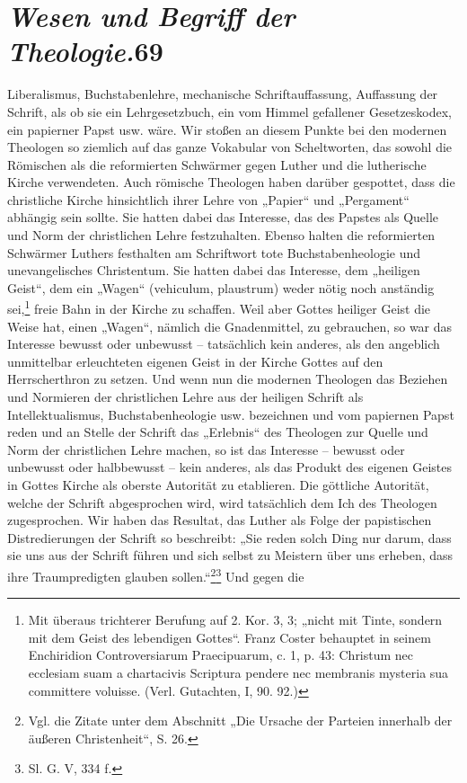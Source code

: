 \section*{\textsl{Wesen und Begriff der Theologie.}\hfill 69}

Liberalismus, Buchstabenlehre, mechanische Schriftauffassung, Auffassung der Schrift, als ob sie ein Lehrgesetzbuch, ein vom Himmel gefallener Gesetzeskodex, ein papierner Papst usw. wäre. Wir stoßen an diesem Punkte bei den modernen Theologen so ziemlich auf das ganze Vokabular von Scheltworten, das sowohl die Römischen als die reformierten Schwärmer gegen Luther und die lutherische Kirche verwendeten. Auch römische Theologen haben darüber gespottet, dass die christliche Kirche hinsichtlich ihrer Lehre von „Papier“ und „Pergament“ abhängig sein sollte. Sie hatten dabei das Interesse, das des Papstes als Quelle und Norm der christlichen Lehre festzuhalten. Ebenso halten die reformierten Schwärmer Luthers festhalten am Schriftwort tote Buchstabenheologie und unevangelisches Christentum. Sie hatten dabei das Interesse, dem „heiligen Geist“, dem ein „Wagen“ (vehiculum, plaustrum) weder nötig noch anständig sei,\footnote{Mit überaus trichterer Berufung auf 2. Kor. 3, 3; „nicht mit Tinte, sondern mit dem Geist des lebendigen Gottes“. Franz Coster behauptet in seinem Enchiridion Controversiarum Praecipuarum, c. 1, p. 43: Christum nec ecclesiam suam a chartacivis Scriptura pendere nec membranis mysteria sua committere voluisse. (Verl. Gutachten, I, 90. 92.)} freie Bahn in der Kirche zu schaffen. Weil aber Gottes heiliger Geist die Weise hat, einen „Wagen“, nämlich die Gnadenmittel, zu gebrauchen, so war das Interesse bewusst oder unbewusst – tatsächlich kein anderes, als den angeblich unmittelbar erleuchteten eigenen Geist in der Kirche Gottes auf den Herrscherthron zu setzen. Und wenn nun die modernen Theologen das Beziehen und Normieren der christlichen Lehre aus der heiligen Schrift als Intellektualismus, Buchstabenheologie usw. bezeichnen und vom papiernen Papst reden und an Stelle der Schrift das „Erlebnis“ des Theologen zur Quelle und Norm der christlichen Lehre machen, so ist das Interesse – bewusst oder unbewusst oder halbbewusst – kein anderes, als das Produkt des eigenen Geistes in Gottes Kirche als oberste Autorität zu etablieren. Die göttliche Autorität, welche der Schrift abgesprochen wird, wird tatsächlich dem Ich des Theologen zugesprochen. Wir haben das Resultat, das Luther als Folge der papistischen Distredierungen der Schrift so beschreibt: „Sie reden solch Ding nur darum, dass sie uns aus der Schrift führen und sich selbst zu Meistern über uns erheben, dass ihre Traumpredigten glauben sollen.“\footnote{Vgl. die Zitate unter dem Abschnitt „Die Ursache der Parteien innerhalb der äußeren Christenheit“, S. 26.}\footnote{Sl. G. V, 334 f.} Und gegen die